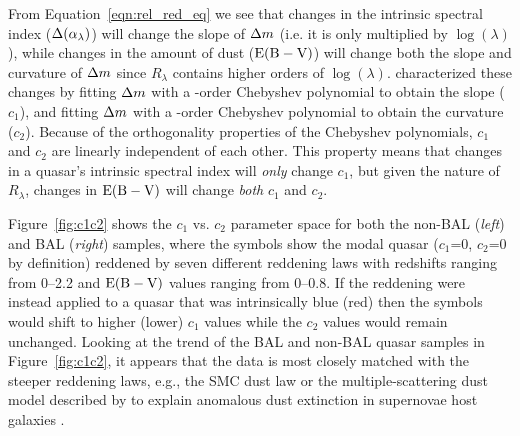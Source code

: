From Equation~\ref{eqn:rel_red_eq} we see that changes in the intrinsic spectral index ($\Delta(\alpha_{\lambda})$) will change the slope of $\Delta m$ (i.e. it is only multiplied by $\log{(\lambda)}$), while changes in the amount of dust (${\rm E(B-V)}$) will change both the slope and curvature of $\Delta m$ since $R_{\lambda}$ contains higher orders of $\log{(\lambda)}$.  \citet{Hopkins:2004} characterized these changes by fitting $\Delta m$ with a -order Chebyshev polynomial to obtain the slope ($c_1$), and fitting $\Delta m$ with a -order Chebyshev polynomial to obtain the curvature ($c_2$).  Because of the orthogonality properties of the Chebyshev polynomials, $c_1$ and $c_2$ are linearly independent of each other.  This property means that changes in a quasar's intrinsic spectral index will {\em only} change $c_1$, but given the nature of $R_{\lambda}$, changes in ${\rm E(B-V)}$ will change {\em both} $c_1$ and $c_2$.

Figure~\ref{fig:c1c2}  shows the $c_1$ vs. $c_2$ parameter space for both the non-BAL ({\em left}) and BAL ({\em right}) samples, where the symbols show the modal quasar ($c_1$=0, $c_2$=0 by definition) reddened by seven different reddening laws with redshifts ranging from 0--2.2 and ${\rm E(B-V)}$ values ranging from 0--0.8. If the reddening were instead applied to a quasar that was intrinsically blue (red) then the symbols would shift to higher (lower) $c_1$ values while the $c_2$ values would remain unchanged.  Looking at the trend of the BAL and non-BAL quasar samples in Figure~\ref{fig:c1c2}, it appears that the data is most closely matched with the steeper reddening laws, e.g., the SMC dust law or the multiple-scattering dust model described by \citet{Goobar:2008} to explain anomalous dust extinction in supernovae host galaxies \citep[see also][]{Fynbo:2013,Leighly:2014}.

